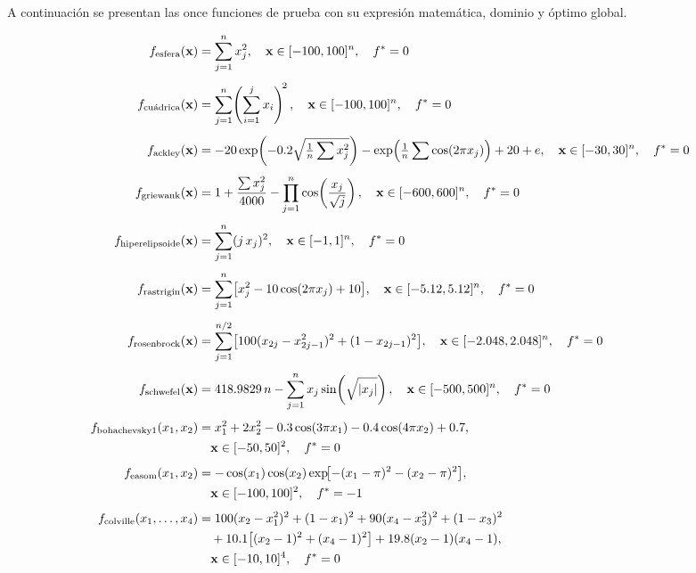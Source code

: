 \documentclass[11pt]{article}
\begin{document}
A continuaci\'on se presentan las once funciones de prueba con su expresi\'on matem\'atica, dominio y \'optimo global.

\begin{align}
f_{\text{esfera}}(\mathbf{x}) &= \sum_{j=1}^{n} x_j^2,
\quad \mathbf{x}\in[-100,100]^n,\quad f^*=0 \notag\\[4pt]
f_{\text{cu\'adrica}}(\mathbf{x}) &= \sum_{j=1}^{n}\!\left(\sum_{i=1}^{j}x_i\right)^{\!2},
\quad \mathbf{x}\in[-100,100]^n,\quad f^*=0 \notag\\[4pt]
f_{\text{ackley}}(\mathbf{x}) &= -20\exp\!\left(-0.2\sqrt{\tfrac{1}{n}\sum x_j^2}\right)
  -\exp\!\left(\tfrac{1}{n}\sum\cos(2\pi x_j)\right)+20+e,
\quad \mathbf{x}\in[-30,30]^n,\quad f^*=0 \notag\\[4pt]
f_{\text{griewank}}(\mathbf{x}) &= 1+\frac{\sum x_j^2}{4000}
  -\prod_{j=1}^{n}\cos\!\left(\frac{x_j}{\sqrt{j}}\right),
\quad \mathbf{x}\in[-600,600]^n,\quad f^*=0 \notag\\[4pt]
f_{\text{hiperelipsoide}}(\mathbf{x}) &= \sum_{j=1}^{n}(j\,x_j)^2,
\quad \mathbf{x}\in[-1,1]^n,\quad f^*=0 \notag\\[4pt]
f_{\text{rastrigin}}(\mathbf{x}) &= \sum_{j=1}^{n}\bigl[x_j^2-10\cos(2\pi x_j)+10\bigr],
\quad \mathbf{x}\in[-5.12,5.12]^n,\quad f^*=0 \notag\\[4pt]
f_{\text{rosenbrock}}(\mathbf{x}) &= \sum_{j=1}^{n/2}\bigl[100(x_{2j}-x_{2j-1}^2)^2+(1-x_{2j-1})^2\bigr],
\quad \mathbf{x}\in[-2.048,2.048]^n,\quad f^*=0 \notag\\[4pt]
f_{\text{schwefel}}(\mathbf{x}) &= 418.9829\,n - \sum_{j=1}^{n}x_j\sin\!\left(\sqrt{|x_j|}\right),
\quad \mathbf{x}\in[-500,500]^n,\quad f^*=0 \notag\\[4pt]
f_{\text{bohachevsky1}}(x_1,x_2) &= x_1^2+2x_2^2
  -0.3\cos(3\pi x_1)-0.4\cos(4\pi x_2)+0.7, \notag\\
&\quad \mathbf{x}\in[-50,50]^2,\quad f^*=0 \notag\\[4pt]
f_{\text{easom}}(x_1,x_2) &= -\cos(x_1)\cos(x_2)\exp\!\bigl[-(x_1-\pi)^2-(x_2-\pi)^2\bigr], \notag\\
&\quad \mathbf{x}\in[-100,100]^2,\quad f^*=-1 \notag\\[4pt]
f_{\text{colville}}(x_1,\ldots,x_4) &= 100(x_2-x_1^2)^2+(1-x_1)^2
  +90(x_4-x_3^2)^2+(1-x_3)^2 \notag\\
&\quad+10.1\bigl[(x_2-1)^2+(x_4-1)^2\bigr]+19.8(x_2-1)(x_4-1), \notag\\
&\quad \mathbf{x}\in[-10,10]^4,\quad f^*=0 \notag
\end{align}
\end{document}
